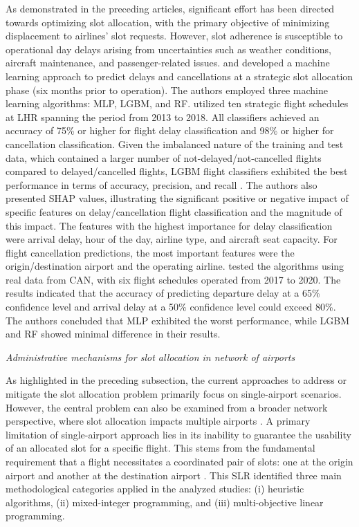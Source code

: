 As demonstrated in the preceding articles, significant effort has been directed towards optimizing slot allocation, with the primary objective of minimizing displacement to airlines’ slot requests. However, slot adherence is susceptible to operational day delays arising from uncertainties such as weather conditions, aircraft maintenance, and passenger-related issues.  and   developed a machine learning approach to predict delays and cancellations at a strategic slot allocation phase (six months prior to operation). The authors employed three machine learning algorithms: \acrfull{MLP}, \acrfull{LGBM}, and \acrfull{RF}.  utilized ten strategic flight schedules at \acrfull{LHR} spanning the period from 2013 to 2018. All classifiers achieved an accuracy of 75\% or higher for flight delay classification and 98\% or higher for cancellation classification. Given the imbalanced nature of the training and test data, which contained a larger number of not-delayed/not-cancelled flights compared to delayed/cancelled flights, \acrshort{LGBM} flight classifiers exhibited the best performance in terms of accuracy, precision, and recall \cite{lambelho_assessing_2020}. The authors also presented \acrfull{SHAP} values, illustrating the significant positive or negative impact of specific features on delay/cancellation flight classification and the magnitude of this impact. The features with the highest importance for delay classification were arrival delay, hour of the day, airline type, and aircraft seat capacity. For flight cancellation predictions, the most important features were the origin/destination airport and the operating airline.  tested the algorithms using real data from \acrfull{CAN}, with six flight schedules operated from 2017 to 2020. The results indicated that the accuracy of predicting departure delay at a 65\% confidence level and arrival delay at a 50\% confidence level could exceed 80\%. The authors concluded that \acrshort{MLP} exhibited the worst performance, while \acrshort{LGBM} and \acrshort{RF} showed minimal difference in their results.

\hfill \break
\textit{Administrative mechanisms for slot allocation in network of airports}
\hfill \break

As highlighted in the preceding subsection, the current approaches to address or mitigate the slot allocation problem primarily focus on single-airport scenarios. However, the central problem can also be examined from a broader network perspective, where slot allocation impacts multiple airports \cite{zografos2017increasing}. A primary limitation of single-airport approach lies in its inability to guarantee the usability of an allocated slot for a specific flight. This stems from the fundamental requirement that a flight necessitates a coordinated pair of slots: one at the origin airport and another at the destination airport \cite{wang_slot_2023}. This \acrfull{SLR} identified three main methodological categories applied in the analyzed studies: (i) heuristic algorithms, (ii) mixed-integer programming, and (iii) multi-objective linear programming.

